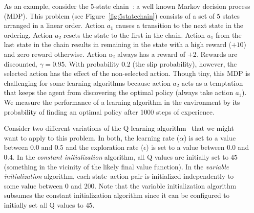 As an example, consider the 5-state chain~\cite{strens2000bayesian}: a well known Markov decision process (MDP).
This problem (see Figure~\ref{fig:5statechain}) consists of a set of 5 states arranged in a linear order. Action $a_1$ causes a transition to the next state in the ordering. Action $a_2$ resets the state to the first in the chain. Action $a_1$ from the last state in the chain results in remaining in the state with a high reward ($+10$) and zero reward otherwise. Action $a_2$ always has a reward of $+2$. Rewards are discounted, $\gamma=0.95$. With probability $0.2$ (the slip probability), however, the selected action has the effect of the non-selected action. Though tiny, this MDP is challenging for some learning algorithms because action $a_2$ acts as a temptation that keeps the agent from discovering the optimal policy (always take action $a_1$). We measure the performance of a learning algorithm in the environment by its probability of finding an optimal policy after 1000 steps of experience. 

Consider two different variations of the Q-learning algorithm~\cite{sutton1998reinforcement} that we might want to apply to this problem. In both, the learning rate ($\alpha$) is set to a value between $0.0$ and $0.5$ and the exploration rate ($\epsilon$) is set to a value between $0.0$ and $0.4$.
In the \emph{constant initialization} algorithm, all Q values are initially set to %
$45$ (something in the vicinity of the likely final value function).
In the \emph{variable initialization} algorithm, each state--action pair is initialized independently to some value between $0$ and $200$. Note that the variable initialization algorithm subsumes the constant initialization algorithm since it can be configured to initially set all Q values to 
$45$.

